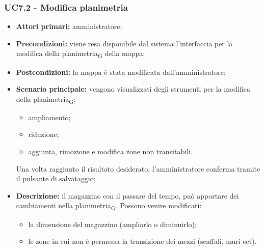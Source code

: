 \subsubsection{UC7.2 - Modifica planimetria}
\begin{itemize}
	\item 	\textbf{Attori primari:} amministratore;
	\item 	\textbf{Precondizioni:} viene resa disponibile dal sistema l’interfaccia per la modifica della \gls{planimetria}\textsubscript{G} della mappa;
	\item 	\textbf{Postcondizioni:} la mappa è stata modificata dall’amministratore;
	\item 	\textbf{Scenario principale:} vengono visualizzati degli strumenti per la modifica della \gls{planimetria}\textsubscript{G}:
	\begin{itemize}
		\item ampliamento;
		\item riduzione;
		\item aggiunta, rimozione e modifica zone non transitabili.
	\end{itemize}
	Una volta raggiunto il risultato desiderato, l’amministratore conferma tramite il pulsante di salvataggio;
	\item 	\textbf{Descrizione:} il magazzino con il passare del tempo, può apportare dei cambiamenti nella \gls{planimetria}\textsubscript{G}. Possono venire modificati:
	\begin{itemize}
		\item la dimensione del magazzino (ampliarlo o diminuirlo);
		\item le zone in cui non è permessa la transizione dei mezzi (scaffali, muri ect).
	\end{itemize}
\end{itemize}

